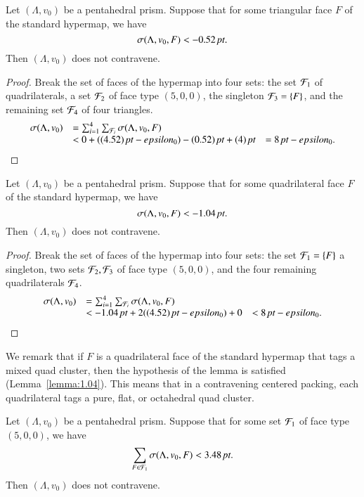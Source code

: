 \begin{lemma}
Let $(\Lambda,v_0)$ be a pentahedral prism.  Suppose that for some triangular face $F$ of the standard hypermap, we have
  $$
  \sigma(\Lambda,v_0,F) < -0.52\,\hbox{\it pt}.
  $$
Then $(\Lambda,v_0)$ does not contravene.
\end{lemma}

\begin{proof}
Break the set of faces of the hypermap into four sets:
the set ${\mathcal F}_1$ of quadrilaterals, a set ${\mathcal F}_2$ of face type $(5,0,0)$,
the singleton ${\mathcal F}_3=\{F\}$, and the remaining set ${\mathcal F}_4$ of four
triangles.
  $$
  \begin{array}{llll}
  \sigma(\Lambda,v_0) &= \sum_{i=1}^4\sum_{{\mathcal F}_i}\sigma(\Lambda,v_0,F)\\
    &< 0 + ((4.52)\,\hbox{\it pt} - epsilon_0) - (0.52)\,\hbox{\it pt} + (4)\,\hbox{\it pt}
    &= 8\,\hbox{\it pt} - epsilon_0.
  \end{array}
  $$
\end{proof}

\begin{lemma}
Let $(\Lambda,v_0)$ be a pentahedral prism.  Suppose that for some 
quadrilateral face $F$ of the standard hypermap, we have
  $$
  \sigma(\Lambda,v_0,F) < -1.04\,\hbox{\it pt}.
  $$
Then $(\Lambda,v_0)$ does not contravene.
\end{lemma}

\begin{proof}
Break the set of faces of the hypermap into four sets:
the set ${\mathcal F}_1=\{F\}$ a singleton, two sets ${\mathcal F}_2,{\mathcal F}_3$ of
face type $(5,0,0)$, and the four remaining quadrilaterals ${\mathcal F}_4$.
  $$
  \begin{array}{llll}
  \sigma(\Lambda,v_0) &= \sum_{i=1}^4\sum_{{\mathcal F}_i}\sigma(\Lambda,v_0,F)\\
    &< -1.04\,\hbox{\it pt} + 2((4.52)\,\hbox{\it pt} - epsilon_0) + 0
    &< 8\,\hbox{\it pt} - epsilon_0.
  \end{array}
  $$
\end{proof}

We remark that if $F$ is a quadrilateral face of the standard hypermap
that tags a mixed quad cluster, then the hypothesis of the lemma
is satisfied (Lemma~\ref{lemma:1.04}).  This means that in a contravening
centered packing, each quadrilateral tags a pure, flat, or octahedral
quad cluster.


\begin{lemma}
Let $(\Lambda,v_0)$ be a pentahedral prism.  Suppose that for some 
set ${\mathcal F}_1$ of face type $(5,0,0)$,  we have
  $$
  \sum_{F\in{\mathcal F}_1}\sigma(\Lambda,v_0,F) < 3.48\,\hbox{\it pt}.
  $$
Then $(\Lambda,v_0)$ does not contravene.
\end{lemma}

